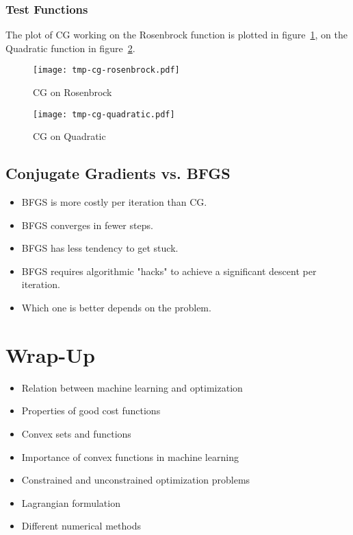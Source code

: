 			\subsubsection{Test Functions}
				The plot of CG working on the Rosenbrock function is plotted in figure~\ref{fig:cgExampleRosenbrock}, on the Quadratic function in figure~\ref{fig:cgExampleQuadratic}.

				\begin{figure} 
					\centering
					\texttt{[image: tmp-cg-rosenbrock.pdf]}
					\caption{CG on Rosenbrock}
					\label{fig:cgExampleRosenbrock}
				\end{figure}
				\begin{figure}
					\centering
					\texttt{[image: tmp-cg-quadratic.pdf]}
					\caption{CG on Quadratic}
					\label{fig:cgExampleQuadratic}
				\end{figure}

		\subsection{Conjugate Gradients vs. BFGS}
			\begin{itemize}
				\item BFGS is more costly per iteration than CG.
				\item BFGS converges in fewer steps.
				\item BFGS has less tendency to get stuck.
				\item BFGS requires algorithmic "hacks" to achieve a significant descent per iteration.
				\item Which one is better depends on the problem.
			\end{itemize}
	
	\section{Wrap-Up}
		\begin{itemize}
			\item Relation between machine learning and optimization
			\item Properties of good cost functions
			\item Convex sets and functions
			\item Importance of convex functions in machine learning
			\item Constrained and unconstrained optimization problems
			\item Lagrangian formulation
			\item Different numerical methods
		\end{itemize}

